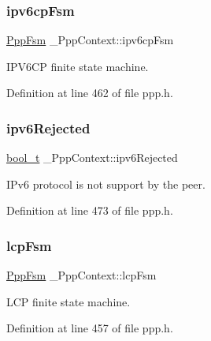 \subsubsection{\texorpdfstring{ipv6cp\+Fsm}{ipv6cpFsm}}
{\footnotesize\ttfamily \hyperlink{structPppFsm}{Ppp\+Fsm} \+\_\+\+Ppp\+Context\+::ipv6cp\+Fsm}



I\+P\+V6\+CP finite state machine. 



Definition at line 462 of file ppp.\+h.

\mbox{\label{struct__PppContext_a0b928522d498c99446a97801fe716346}} 
\subsubsection{\texorpdfstring{ipv6\+Rejected}{ipv6Rejected}}
{\footnotesize\ttfamily \hyperlink{compiler__port_8h_a812d16e5494522586b3784e55d479912}{bool\+\_\+t} \+\_\+\+Ppp\+Context\+::ipv6\+Rejected}



I\+Pv6 protocol is not support by the peer. 



Definition at line 473 of file ppp.\+h.

\mbox{\label{struct__PppContext_a793e2610301d4d7344ed44e0b0385ed9}} 
\subsubsection{\texorpdfstring{lcp\+Fsm}{lcpFsm}}
{\footnotesize\ttfamily \hyperlink{structPppFsm}{Ppp\+Fsm} \+\_\+\+Ppp\+Context\+::lcp\+Fsm}



L\+CP finite state machine. 



Definition at line 457 of file ppp.\+h.

\mbox{\label{struct__PppContext_a2f4dc2589744adf2ba4e93cf312a8ef7}} 
